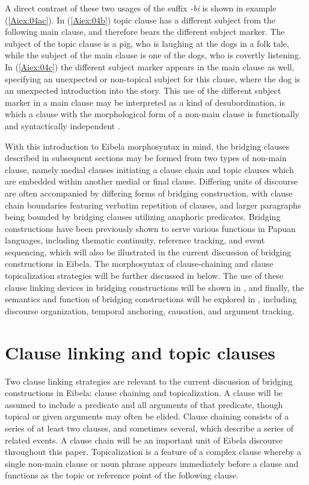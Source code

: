 \documentclass[output=paper]{LSP/langsci}
\begin{document}
A direct contrast of these two usages of the suffix \textit{-bi} is shown in example (\ref{Aiex:04ac}). In (\ref{Aiex:04b}) topic clause has a different subject from the following main clause, and therefore bears the different subject marker. The subject of the topic clause is a pig, who is laughing at the dogs in a folk tale, while the subject of the main clause is one of the dogs, who is covertly listening. In (\ref{Aiex:04c}) the different subject marker appears in the main clause as well, specifying an unexpected or non-topical subject for this clause, where the dog is an unexpected introduction into the story. This use of the different subject marker in a main clause may be interpreted as a kind of desubordination, is which a clause with the morphological form of a non-main clause is functionally and syntactically independent \citep{evans07}.

With this introduction to Eibela morphosyntax in mind, the bridging clauses described in
subsequent sections may be formed from two types of non-main clause, namely medial clauses
initiating a clause chain and topic clauses which are embedded within another medial or final clause.
Differing units of discourse are often accompanied by differing forms of bridging construction, with
clause chain boundaries featuring verbatim repetition of clauses, and larger paragraphs being bounded
by bridging clauses utilizing anaphoric predicates. Bridging constructions have been previously shown to
serve various functions in Papuan languages, including thematic continuity, reference tracking, and
event sequencing, which will also be illustrated in the current discussion of bridging constructions in
Eibela. The morphosyntax of clause-chaining and clause topicalization strategies will be further
discussed in  below. The use of these clause linking devices in bridging constructions will be shown in
, and finally, the semantics and function of bridging constructions will be explored in , including
discourse organization, temporal anchoring, causation, and argument tracking.

\section{Clause linking and topic clauses} 
\label{Ailinkingtopic}
Two clause linking strategies are relevant to the current discussion of bridging constructions in
Eibela: clause chaining and topicalization. A clause will be assumed to include a predicate and all
arguments of that predicate, though topical or given arguments may often be elided. Clause chaining
consists of a series of at least two clauses, and sometimes several, which describe a series of related
events. A clause chain will be an important unit of Eibela discourse throughout this paper. Topicalization
is a feature of a complex clause whereby a single non-main clause or noun phrase appears immediately
before a clause and functions as the topic or reference point of the following clause.
\end{document}
